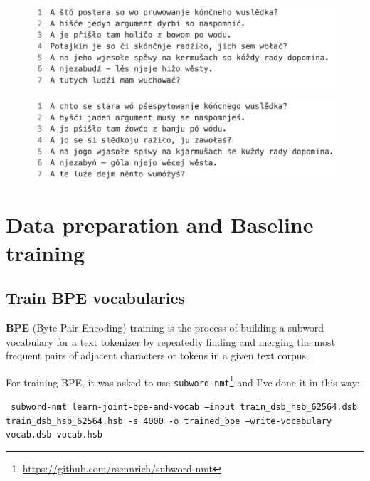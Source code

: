 \documentclass[12pt]{article}
\begin{document}
\begin{figure}
    \begin{minipage}{.5\textwidth}
      \centering
      \includegraphics[width=1\linewidth]{report/figures/hsb-example.png}
      \label{fig:hsb-example}
    \end{minipage}%
    \begin{minipage}{.5\textwidth}
      \centering
      \includegraphics[width=1\linewidth]{report/figures/dsb-example.png}
      \label{fig:dsb-example}
    \end{minipage}
\end{figure}

\section{Data preparation and Baseline training}
\subsection{Train BPE vocabularies}
\textbf{BPE} (Byte Pair Encoding) training is the process of building a subword vocabulary for a text tokenizer by repeatedly finding and merging the most frequent pairs of adjacent characters or tokens in a given text corpus.

For training BPE, it was asked to use \texttt{subword-nmt}\footnote{\href{https://github.com/rsennrich/subword-nmt}
{https://github.com/rsennrich/subword-nmt}} and I've done it in this way:

\vspace{0.5cm}
\texttt{
  subword-nmt learn-joint-bpe-and-vocab --input train\_dsb\_hsb\_62564.dsb train\_dsb\_hsb\_62564.hsb -s 4000 -o trained\_bpe --write-vocabulary vocab.dsb vocab.hsb
}
\end{document}
